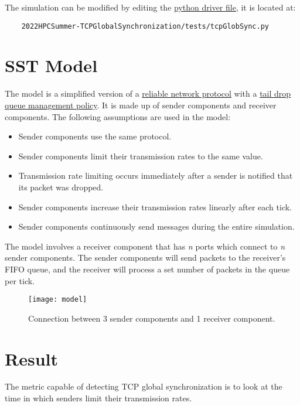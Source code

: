 \documentclass{article}
\begin{document}
\noindent The simulation can be modified by editing the \href{http://sst-simulator.org/SSTPages/SSTUserPythonFileFormat/}{python driver file}, it is located at:

\begin{verbatim}
	2022HPCSummer-TCPGlobalSynchronization/tests/tcpGlobSync.py
\end{verbatim}

\section{SST Model}

The model is a simplified version of a \href{https://en.wikipedia.org/wiki/Reliability_(computer_networking)}{reliable network protocol} with a \href{https://en.wikipedia.org/wiki/Tail_drop}{tail drop queue management policy}. It is made up of sender components and receiver components. The following assumptions are used in the model:

\begin{itemize}
	\item Sender components use the same protocol.
	\item Sender components limit their transmission rates to the same value.
	\item Transmission rate limiting occurs immediately after a sender is notified that its packet was dropped.
	\item Sender components increase their transmission rates linearly after each tick.
	\item Sender components continuously send messages during the entire simulation.
\end{itemize}

The model involves a receiver component that has \textit{n} ports which connect to \textit{n} sender components. The sender components will send packets to the receiver's FIFO queue, and the receiver will process a set number of packets in the queue per tick. 

\begin{figure}[H]
	\centering
	\texttt{[image: model]}
	\caption{Connection between 3 sender components and 1 receiver component.}
\end{figure}

\section{Result} %

The metric capable of detecting TCP global synchronization is to look at the time in which senders limit their transmission rates.
\end{document}
